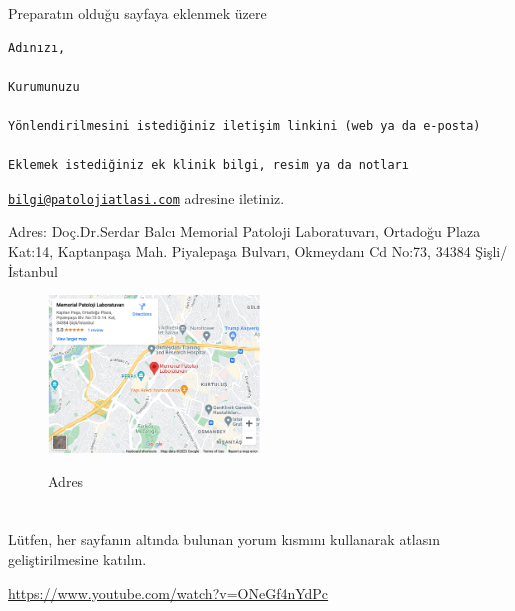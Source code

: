 \documentclass[
  letterpaper,
  DIV=11,
  numbers=noendperiod]{scrreprt}
\begin{document}
Preparatın olduğu sayfaya eklenmek üzere

\begin{verbatim}
Adınızı,

Kurumunuzu

Yönlendirilmesini istediğiniz iletişim linkini (web ya da e-posta)

Eklemek istediğiniz ek klinik bilgi, resim ya da notları
\end{verbatim}

\href{mailto:bilgi@patolojiatlasi.com}{\nolinkurl{bilgi@patolojiatlasi.com}}
adresine iletiniz.

Adres: Doç.Dr.Serdar Balcı Memorial Patoloji Laboratuvarı, Ortadoğu
Plaza Kat:14, Kaptanpaşa Mah. Piyalepaşa Bulvarı, Okmeydanı Cd No:73,
34384 Şişli/İstanbul

\begin{figure}

{\centering 

\href{https://www.google.com/maps/embed?pb=!1m14!1m8!1m3!1d12033.28963318435!2d28.9735333!3d41.0619447!3m2!1i1024!2i768!4f13.1!3m3!1m2!1s0x0\%3A0x5b15447cefe51a4e!2sMemorial\%20Patoloji\%20Laboratuvar\%C4\%B1!5e0!3m2!1sen!2str!4v1646745650518!5m2!1sen!2str}{\includegraphics[width=0.5\textwidth,height=\textheight]{./screenshots/katki_screenshot.png}}

}

\caption{Adres}

\end{figure}

\hypertarget{section-1}{%
\chapter{}\label{section-1}}

Lütfen, her sayfanın altında bulunan yorum kısmını kullanarak atlasın
geliştirilmesine katılın.

\url{https://www.youtube.com/watch?v=ONeGf4nYdPc}



\printindex
\end{document}
